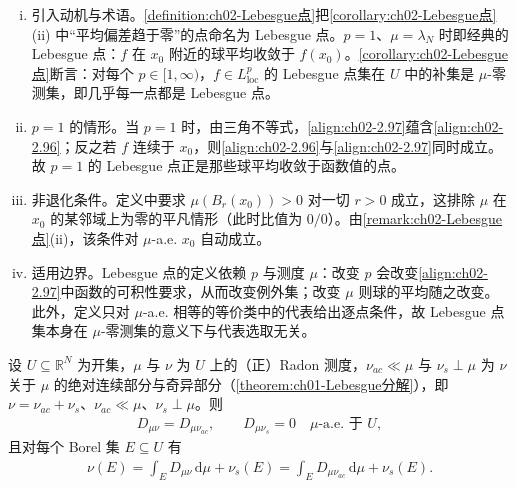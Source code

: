 \documentclass[../../main.tex]{subfiles}%
\begin{document}
\begin{remark}\label{remark:ch02-Lebesgue点定义}
\begin{enumerate}[(i)]
\item 引入动机与术语。\cref{definition:ch02-Lebesgue点}把\cref{corollary:ch02-Lebesgue点}(ii) 中“平均偏差趋于零”的点命名为 Lebesgue 点。$p=1$、$\mu=\lambda_N$ 时即经典的 Lebesgue 点：$f$ 在 $x_0$ 附近的球平均收敛于 $f(x_0)$。\cref{corollary:ch02-Lebesgue点}断言：对每个 $p\in[1,\infty)$，$f\in L^p_{\mathrm{loc}}$ 的 Lebesgue 点集在 $U$ 中的补集是 $\mu$-零测集，即几乎每一点都是 Lebesgue 点。
\item $p=1$ 的情形。当 $p=1$ 时，由三角不等式，\eqref{align:ch02-2.97}蕴含\eqref{align:ch02-2.96}；反之若 $f$ 连续于 $x_0$，则\eqref{align:ch02-2.96}与\eqref{align:ch02-2.97}同时成立。故 $p=1$ 的 Lebesgue 点正是那些球平均收敛于函数值的点。
\item 非退化条件。定义中要求 $\mu(B_r(x_0))>0$ 对一切 $r>0$ 成立，这排除 $\mu$ 在 $x_0$ 的某邻域上为零的平凡情形（此时比值为 $0/0$）。由\cref{remark:ch02-Lebesgue点}(ii)，该条件对 $\mu$-a.e. $x_0$ 自动成立。
\item 适用边界。Lebesgue 点的定义依赖 $p$ 与测度 $\mu$：改变 $p$ 会改变\eqref{align:ch02-2.97}中函数的可积性要求，从而改变例外集；改变 $\mu$ 则球的平均随之改变。此外，定义只对 $\mu$-a.e. 相等的等价类中的代表给出逐点条件，故 Lebesgue 点集本身在 $\mu$-零测集的意义下与代表选取无关。
\end{enumerate}
\end{remark}

\begin{corollary}\label{corollary:ch02-Lebesgue分解}\label{corollary:ch02-带号Radon微分}
设 $U\subseteq\mathbb R^N$ 为开集，$\mu$ 与 $\nu$ 为 $U$ 上的（正）Radon 测度，$\nu_{ac}\ll\mu$ 与 $\nu_s\perp\mu$ 为 $\nu$ 关于 $\mu$ 的绝对连续部分与奇异部分（\cref{theorem:ch01-Lebesgue分解}），即 $\nu=\nu_{ac}+\nu_s$、$\nu_{ac}\ll\mu$、$\nu_s\perp\mu$。则
\begin{align}
D_{\mu\nu}=D_{\mu\nu_{ac}},\qquad D_{\mu\nu_s}=0\quad\mu\text{-a.e. 于 }U, \label{align:ch02-2.98}
\end{align}
且对每个 Borel 集 $E\subseteq U$ 有
\begin{align}
\nu(E)=\int_ED_{\mu\nu}\,\mathrm{d}\mu+\nu_s(E)=\int_ED_{\mu\nu_{ac}}\,\mathrm{d}\mu+\nu_s(E). \label{align:ch02-2.99}
\end{align}
\end{corollary}
\end{document}
